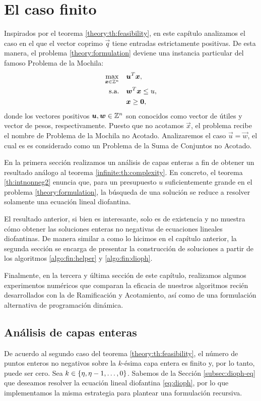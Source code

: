 \chapter{El caso finito}
\noindent
Inspirados por el teorema \ref{theory:th:feasibility}, en este capítulo analizamos el
caso en el que el vector coprimo $\vec{q}$ tiene entradas estrictamente positivas. De esta manera,
el problema \eqref{theory:formulation} deviene una instancia particular del famoso Problema de la
Mochila:
\begin{subequations}
	\label{knapsack-formulation}
	\begin{align}
		\max_{\boldsymbol{x} \in \mathbb{Z}^n} \quad
			& \boldsymbol{u}^T\boldsymbol{x}, \\
		\text{s.a.} \quad
			& \boldsymbol{w}^T\boldsymbol{x} \leq u, \\
			& \boldsymbol{x} \geq \boldsymbol{0},
	\end{align}
\end{subequations}
donde los vectores positivos $\boldsymbol{u}, \boldsymbol{w} \in \mathbb{Z}^n$ son conocidos como
vector de útiles y vector de pesos, respectivamente. Puesto que no acotamos
$\vec{x}$, el problema recibe el nombre de Problema de la Mochila no Acotado.
Analizaremos el caso $\vec{u} = \vec{w}$, el cual es es considerado como un
Problema de la Suma de Conjuntos no Acotado.

En la primera sección realizamos un análisis de capas enteras a fin de obtener
un resultado análogo al teorema \ref{infinite:th:complexity}. En concreto, el
teorema \ref{th:intnonneg2} enuncia que, para un presupuesto $u$
suficientemente grande en el problema \eqref{theory:formulation}, la búsqueda
de una solución se reduce a resolver solamente una ecuación lineal diofantina.

El resultado anterior, si bien es interesante, solo es de existencia y no
muestra cómo obtener las soluciones enteras no negativas de ecuaciones lineales
diofantinas. De manera similar a como lo hicimos en el capítulo anterior, la
segunda sección se encarga de presentar la construcción de soluciones a partir
de los algoritmos \ref{algo:fin:helper} y \ref{algo:fin:dioph}.

Finalmente, en la tercera y última sección de este capítulo, realizamos algunos experimentos
numéricos que comparan la eficacia de nuestros algoritmos recién desarrollados con la de
Ramificación y Acotamiento, así como de una formulación alternativa de programación dinámica.

\section{Análisis de capas enteras}
\noindent
De acuerdo al segundo caso del teorema \ref{theory:th:feasibility}, el número de puntos enteros no
negativos sobre la $k$-ésima capa entera es finito y, por lo tanto, puede ser cero. Sea $k \in
\lbrace \eta, \eta - 1, \ldots, 0 \rbrace$. Sabemos de la Sección \ref{subsec:dioph-eq} que deseamos resolver la
ecuación lineal diofantina \eqref{eq:dioph}, por lo que implementamos la misma estrategia para
plantear una formulación recursiva. 

